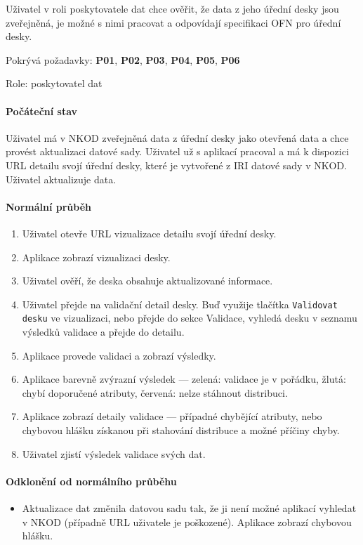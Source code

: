 Uživatel v roli poskytovatele dat chce ověřit, že data z jeho úřední desky jsou zveřejněná, je možné s nimi pracovat a odpovídají specifikaci OFN pro úřední desky.

Pokrývá požadavky: \textbf{P01}, \textbf{P02}, \textbf{P03}, \textbf{P04}, \textbf{P05}, \textbf{P06}

Role: poskytovatel dat

\paragraph{Počáteční stav} 
Uživatel má v NKOD zveřejněná data z úřední desky jako otevřená data a chce provést aktualizaci datové sady. Uživatel už s aplikací pracoval a má k dispozici URL detailu svojí úřední desky, které je vytvořené z IRI datové sady v NKOD. Uživatel aktualizuje data.

\paragraph{Normální průběh}
\begin{enumerate}
    \item Uživatel otevře URL vizualizace detailu svojí úřední desky.
    \item Aplikace zobrazí vizualizaci desky.
    \item Uživatel ověří, že deska obsahuje aktualizované informace.
    \item Uživatel přejde na validační detail desky. Buď využije tlačítka \texttt{Validovat desku} ve vizualizaci, nebo přejde do sekce Validace, vyhledá desku v seznamu výsledků validace a přejde do detailu.
    \item Aplikace provede validaci a zobrazí výsledky. 
    \item Aplikace barevně zvýrazní výsledek --- zelená: validace je v pořádku, žlutá: chybí doporučené atributy, červená: nelze stáhnout distribuci.
    \item Aplikace zobrazí detaily validace --- případné chybějící atributy, nebo chybovou hlášku získanou při stahování distribuce a možné příčiny chyby.
    \item Uživatel zjistí výsledek validace svých dat.
\end{enumerate}

\paragraph{Odklonění od normálního průběhu}
\begin{itemize}
    \item Aktualizace dat změnila datovou sadu tak, že ji není možné aplikací vyhledat v NKOD (případně URL uživatele je poškozené). Aplikace zobrazí chybovou hlášku.
\end{itemize}

